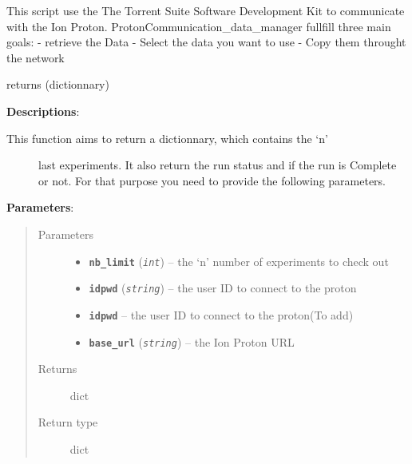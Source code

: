 \documentclass[letterpaper,10pt,english]{sphinxmanual}
\begin{document}
This script use the The Torrent Suite Software Development Kit
to communicate with the Ion Proton.
ProtonCommunication\_data\_manager fullfill three main goals:
- retrieve the Data
- Select the data you want to use
- Copy them throught the network

\begin{fulllineitems}
\label{datamanagerpkg:datamanagerpkg.ProtonCommunication_data_manager.CheckExperiments}
returns (dictionnary)

\textbf{Descriptions}:
\begin{description}
\item[{This function aims to return a dictionnary, which contains the `n'}] \leavevmode
last experiments. It also return the run status and if the run is Complete or not.
For that purpose you need to provide the following parameters.

\end{description}

\textbf{Parameters}:
\begin{quote}\begin{description}
\item[{Parameters}] \leavevmode\begin{itemize}
\item {} 
\textbf{\texttt{nb\_limit}} (\emph{\texttt{int}}) -- the `n' number of experiments to check out

\item {} 
\textbf{\texttt{idpwd}} (\emph{\texttt{string}}) -- the user ID to connect to the proton

\item {} 
\textbf{\texttt{idpwd}} -- the user ID to connect to the proton(To add)

\item {} 
\textbf{\texttt{base\_url}} (\emph{\texttt{string}}) -- the Ion Proton URL

\end{itemize}

\item[{Returns}] \leavevmode
dict

\item[{Return type}] \leavevmode

dict
\begin{quote}
\begin{quote}


\end{quote}
\end{quote}
\end{description}
\end{quote}
\end{fulllineitems}
\end{document}

